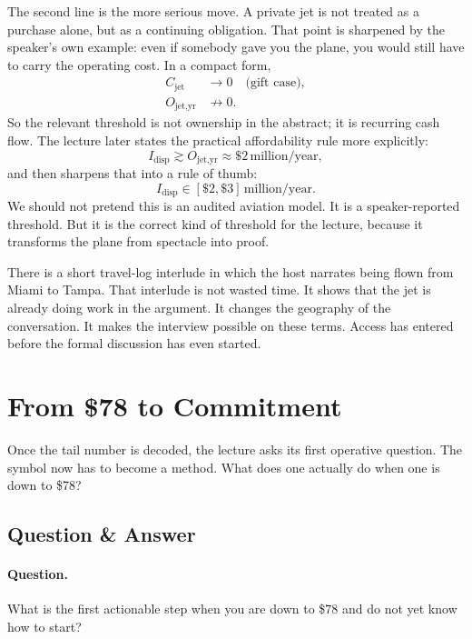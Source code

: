 The second line is the more serious move. A private jet is not treated as a purchase alone, but as a continuing obligation. That point is sharpened by the speaker’s own example: even if somebody gave you the plane, you would still have to carry the operating cost. In a compact form,
\begin{align}
C_{\text{jet}} &\to 0 \quad \text{(gift case)}, \\
O_{\text{jet,yr}} &\not\to 0.
\end{align}
So the relevant threshold is not ownership in the abstract; it is recurring cash flow. The lecture later states the practical affordability rule more explicitly:
\begin{equation}
I_{\text{disp}} \gtrsim O_{\text{jet,yr}} \approx \$2\,\text{million/year},
\end{equation}
and then sharpens that into a rule of thumb:
\begin{equation}
I_{\text{disp}} \in [\$2,\$3]\,\text{million/year}.
\end{equation}
We should not pretend this is an audited aviation model. It is a speaker-reported threshold. But it is the correct kind of threshold for the lecture, because it transforms the plane from spectacle into proof.

There is a short travel-log interlude in which the host narrates being flown from Miami to Tampa. That interlude is not wasted time. It shows that the jet is already doing work in the argument. It changes the geography of the conversation. It makes the interview possible on these terms. Access has entered before the formal discussion has even started.

\section{From \$78 to Commitment}

Once the tail number is decoded, the lecture asks its first operative question. The symbol now has to become a method. What does one actually do when one is down to \$78?

\subsection{Question \& Answer}

\paragraph{Question.} What is the first actionable step when you are down to \$78 and do not yet know how to start?

